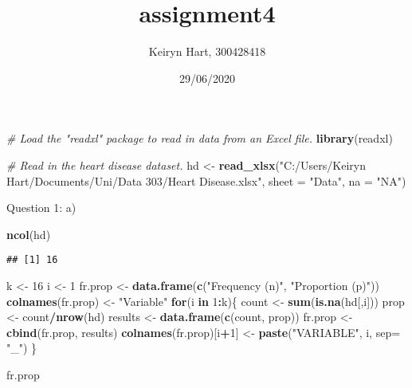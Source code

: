 \documentclass[]{article}
\title{assignment4}
\author{Keiryn Hart, 300428418}
\date{29/06/2020}
\newenvironment{Shaded}{\begin{snugshade}}{\end{snugshade}}
\newcommand{\CommentTok}[1]{\textcolor[rgb]{0.56,0.35,0.01}{\textit{#1}}}
\newcommand{\ControlFlowTok}[1]{\textcolor[rgb]{0.13,0.29,0.53}{\textbf{#1}}}
\newcommand{\DataTypeTok}[1]{\textcolor[rgb]{0.13,0.29,0.53}{#1}}
\newcommand{\DecValTok}[1]{\textcolor[rgb]{0.00,0.00,0.81}{#1}}
\newcommand{\KeywordTok}[1]{\textcolor[rgb]{0.13,0.29,0.53}{\textbf{#1}}}
\newcommand{\NormalTok}[1]{#1}
\newcommand{\OperatorTok}[1]{\textcolor[rgb]{0.81,0.36,0.00}{\textbf{#1}}}
\newcommand{\StringTok}[1]{\textcolor[rgb]{0.31,0.60,0.02}{#1}}
\begin{document}
\maketitle

\begin{Shaded}
\begin{Highlighting}[]
\CommentTok{# Load the "readxl" package to read in data from an Excel file.}
\KeywordTok{library}\NormalTok{(readxl)}

\CommentTok{# Read in the heart disease dataset.}
\NormalTok{hd <-}\StringTok{ }\KeywordTok{read_xlsx}\NormalTok{(}\StringTok{"C:/Users/Keiryn Hart/Documents/Uni/Data 303/Heart Disease.xlsx"}\NormalTok{, }\DataTypeTok{sheet =} \StringTok{"Data"}\NormalTok{, }\DataTypeTok{na =} \StringTok{"NA"}\NormalTok{)}
\end{Highlighting}
\end{Shaded}

Question 1: a)

\begin{Shaded}
\begin{Highlighting}[]
\KeywordTok{ncol}\NormalTok{(hd)}
\end{Highlighting}
\end{Shaded}

\begin{verbatim}
## [1] 16
\end{verbatim}

\begin{Shaded}
\begin{Highlighting}[]
\NormalTok{k <-}\StringTok{ }\DecValTok{16}
\NormalTok{i <-}\StringTok{ }\DecValTok{1}
\NormalTok{fr.prop <-}\StringTok{ }\KeywordTok{data.frame}\NormalTok{(}\KeywordTok{c}\NormalTok{(}\StringTok{"Frequency (n)"}\NormalTok{, }\StringTok{"Proportion (p)"}\NormalTok{))}
\KeywordTok{colnames}\NormalTok{(fr.prop) <-}\StringTok{ "Variable"}
\ControlFlowTok{for}\NormalTok{(i }\ControlFlowTok{in} \DecValTok{1}\OperatorTok{:}\NormalTok{k)\{}
\NormalTok{  count <-}\StringTok{ }\KeywordTok{sum}\NormalTok{(}\KeywordTok{is.na}\NormalTok{(hd[,i]))}
\NormalTok{  prop <-}\StringTok{ }\NormalTok{count}\OperatorTok{/}\KeywordTok{nrow}\NormalTok{(hd)}
\NormalTok{  results <-}\StringTok{ }\KeywordTok{data.frame}\NormalTok{(}\KeywordTok{c}\NormalTok{(count, prop))}
\NormalTok{  fr.prop <-}\StringTok{ }\KeywordTok{cbind}\NormalTok{(fr.prop, results)}
  \KeywordTok{colnames}\NormalTok{(fr.prop)[i}\OperatorTok{+}\DecValTok{1}\NormalTok{] <-}\StringTok{ }\KeywordTok{paste}\NormalTok{(}\StringTok{"VARIABLE"}\NormalTok{, i, }\DataTypeTok{sep=} \StringTok{"_"}\NormalTok{)}
\NormalTok{\}}

\NormalTok{fr.prop}
\end{Highlighting}
\end{Shaded}
\end{document}
